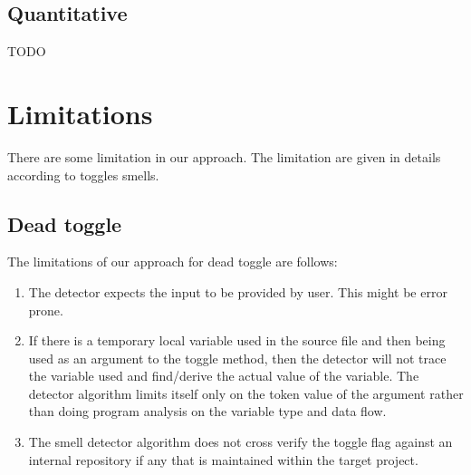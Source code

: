 \documentclass[conference]{IEEEtran}
\begin{document}
\subsection{Quantitative}
TODO

\section{Limitations}
\label{Limitation of our approach}
There are some limitation in our approach. The limitation are given in details according to toggles smells.
\subsection{Dead toggle}
The limitations of our approach for dead toggle are follows:

\begin{enumerate}
\item{The detector expects the input to be provided by user. This might be error prone.}
	
\item{If there is a temporary local variable used in the source file and then being used as an argument to the toggle method, then the detector will not trace the variable used and find/derive the actual value of the variable. The detector algorithm limits itself only on the token value of the argument rather than doing program analysis on the variable type and data flow.}
	
\item{The smell detector algorithm does not cross verify the toggle flag against an internal repository if any that is maintained within the target project.}
\end{enumerate}
\end{document}
